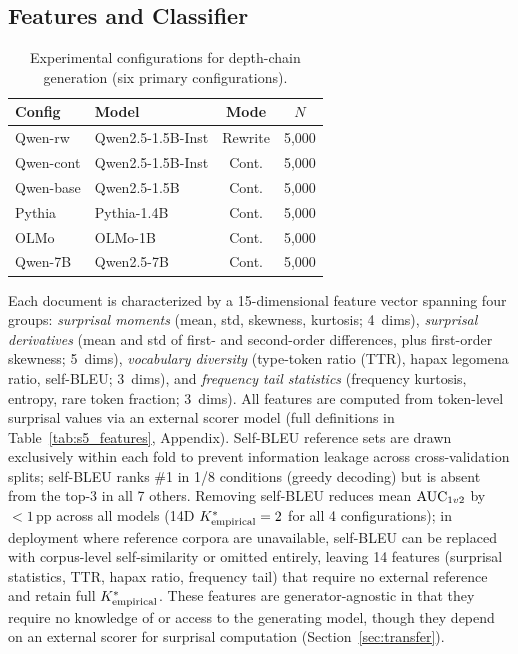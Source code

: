 \subsection{Features and Classifier}
\label{sec:features}

\begin{table}[t]
\centering
\small
\caption{Experimental configurations for depth-chain generation (six primary configurations).}
\label{tab:setup}
\vspace{2pt}
\begin{tabular}{llcc}
  \toprule
  \textbf{Config} & \textbf{Model} & \textbf{Mode} & $N$ \\
  \midrule
  Qwen-rw   & Qwen2.5-1.5B-Inst & Rewrite & 5{,}000 \\
  Qwen-cont & Qwen2.5-1.5B-Inst & Cont.   & 5{,}000 \\
  Qwen-base & Qwen2.5-1.5B      & Cont.   & 5{,}000 \\
  Pythia    & Pythia-1.4B        & Cont.   & 5{,}000 \\
  OLMo      & OLMo-1B           & Cont.   & 5{,}000 \\
  Qwen-7B   & Qwen2.5-7B        & Cont.   & 5{,}000 \\
  \bottomrule
\end{tabular}
\end{table}

Each document is characterized by a 15-dimensional feature vector spanning four groups: \emph{surprisal moments} (mean, std, skewness, kurtosis; 4~dims), \emph{surprisal derivatives} (mean and std of first- and second-order differences, plus first-order skewness; 5~dims), \emph{vocabulary diversity} (type-token ratio (TTR), hapax legomena ratio, self-BLEU; 3~dims), and \emph{frequency tail statistics} (frequency kurtosis, entropy, rare token fraction; 3~dims).
All features are computed from token-level surprisal values via an external scorer model (full definitions in Table~\ref{tab:s5_features}, Appendix).
Self-BLEU reference sets are drawn exclusively within each fold to prevent information leakage across cross-validation splits; self-BLEU ranks \#1 in 1/8 conditions (greedy decoding) but is absent from the top-3 in all 7 others.
Removing self-BLEU reduces mean $\text{AUC}_{1v2}$ by $< 1$\,pp across all models (14D ${K^*_{\text{empirical}}} = 2$ for all 4 configurations); in deployment where reference corpora are unavailable, self-BLEU can be replaced with corpus-level self-similarity or omitted entirely, leaving 14 features (surprisal statistics, TTR, hapax ratio, frequency tail) that require no external reference and retain full ${K^*_{\text{empirical}}}$.
These features are generator-agnostic in that they require no knowledge of or access to the generating model, though they depend on an external scorer for surprisal computation (Section~\ref{sec:transfer}).

